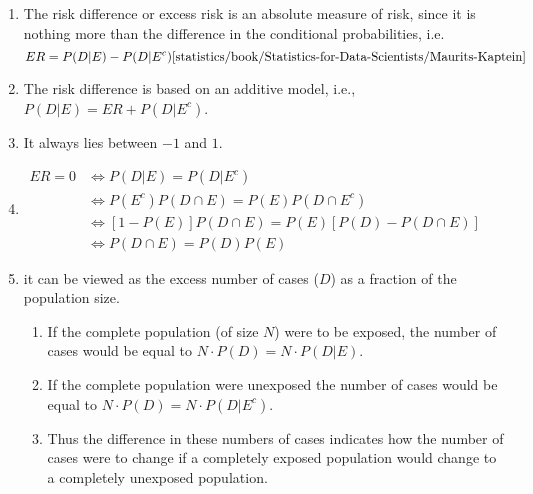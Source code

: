 \begin{enumerate}
    \item The risk difference or excess risk is an absolute measure of risk, since it is nothing more than the difference in the conditional probabilities, i.e.
    \hfill \cite{statistics/book/Statistics-for-Data-Scientists/Maurits-Kaptein}
    \[
        ER = P(D|E) - P(D|E^c)
        \hfill
        \text{\cite{statistics/book/Statistics-for-Data-Scientists/Maurits-Kaptein}}
    \]

    \item The risk difference is based on an additive model, i.e., $P (D|E) = ER + P (D|E^c)$.
    \hfill \cite{statistics/book/Statistics-for-Data-Scientists/Maurits-Kaptein}

    \item It always lies between $-1$ and $1$.
    \hfill \cite{statistics/book/Statistics-for-Data-Scientists/Maurits-Kaptein}

    \item $
        \begin{aligned}
            ER = 0
            & \Longleftrightarrow
            P (D|E) = P (D|E^c) \\
            & \Longleftrightarrow
            P (E^c) P (D \cap E) = P (E) P (D \cap E^c) \\
            & \Longleftrightarrow
            [1 - P (E)] P (D \cap E) = P (E)[P(D) - P (D \cap E)] \\
            & \Longleftrightarrow
            P (D \cap E) = P (D) P (E)
        \end{aligned}
    $
    \hfill \cite{statistics/book/Statistics-for-Data-Scientists/Maurits-Kaptein}

    \item it can be viewed as the excess number of cases ($D$) as a fraction of the population size.
    \hfill \cite{statistics/book/Statistics-for-Data-Scientists/Maurits-Kaptein}
    \begin{enumerate}
        \item If the complete population (of size $N$) were to be exposed, the number of cases would be equal to $N \cdot P (D) = N \cdot P (D|E)$.
        \hfill \cite{statistics/book/Statistics-for-Data-Scientists/Maurits-Kaptein}

        \item If the complete population were unexposed the number of cases would be equal to $N \cdot P (D) = N \cdot P (D|E^c)$.
        \hfill \cite{statistics/book/Statistics-for-Data-Scientists/Maurits-Kaptein}

        \item Thus the difference in these numbers of cases indicates how the number of cases were to change if a completely exposed population would change to a completely unexposed population.
        \hfill \cite{statistics/book/Statistics-for-Data-Scientists/Maurits-Kaptein}
    \end{enumerate}
\end{enumerate}

